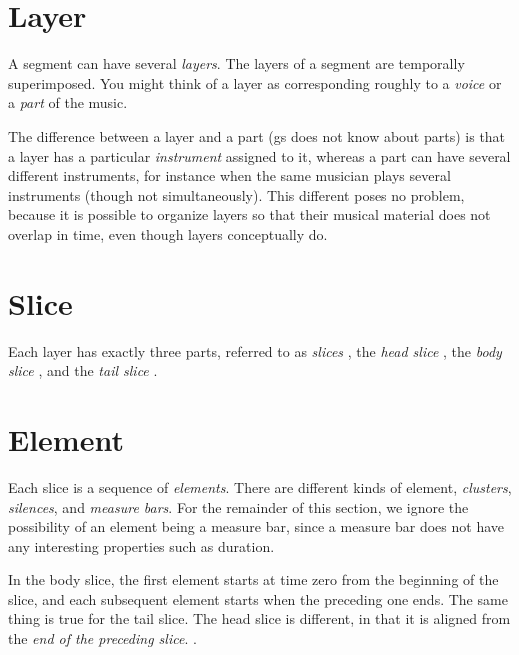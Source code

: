 \section{Layer}

A segment can have several \emph{layers}.  The layers of
a segment are temporally superimposed.  You might think of a layer as
corresponding roughly to a \emph{voice}  or a \emph{part}
 of the music.  

The difference between a layer and a part ({gs} does not know about
parts) is that a layer has a particular \emph{instrument}
 assigned to it, whereas a part can have several
different instruments, for instance when the same musician plays
several instruments (though not simultaneously).  This different poses
no problem, because it is possible to organize {\gs} layers so that
their musical material does not overlap in time, even though layers
conceptually do. 

\section{Slice}

Each layer has exactly three parts, referred to as \emph{slices}
, the \emph{head slice}
, the \emph{body slice}
, and the \emph{tail slice}
. 

\section{Element}

Each slice is a sequence of \emph{elements}.  There are
different kinds of element, \emph{clusters},
\emph{silences}, and \emph{measure bars}.  For the remainder of this section, we ignore the possibility of
an element being a measure bar, since a measure bar does not have any
interesting properties such as duration.

In the body slice, the first element starts at time zero from the
beginning of the slice, and each subsequent element starts when the
preceding one ends.  The same thing is true for the tail
slice.  The head slice is
different, in that it is aligned from the \emph{end of the preceding
slice}.  .

